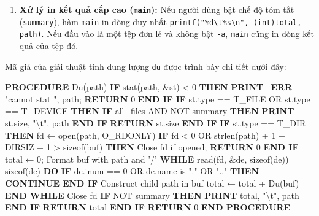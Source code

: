 \documentclass[12pt,a4paper]{article}
\newenvironment{algorithmblock}[1]{%
  \begin{tcolorbox}[
    enhanced,
    breakable,
    colback=white,
    colframe=primary!55,
    colbacktitle=primary,
    coltitle=white,
    boxrule=0.7pt,
    arc=2pt,
    left=10pt,right=10pt,top=7pt,bottom=8pt,
    title={#1},
    fonttitle=\small
  ]
}{%
  \end{tcolorbox}
}
\begin{document}
\begin{enumerate}
\begin{itemize}
\begin{itemize}
    \end{itemize}
    \item Đóng thư mục \texttt{close(fd)}.
    \item \textbf{In kết quả thư mục:} Nếu không bật cờ \texttt{summary}, in dung lượng tổng của thư mục hiện tại: \texttt{printf("\%d\textbackslash t\%s\textbackslash n", (int)total, path)}.
    \item Trả về giá trị \texttt{total}.
  \end{itemize}
  \item \textbf{Xử lý in kết quả cấp cao (\texttt{main}):}
  Nếu người dùng bật chế độ tóm tắt (\texttt{summary}), hàm \texttt{main} in dòng duy nhất \texttt{printf("\%d\textbackslash t\%s\textbackslash n", (int)total, path)}. Nếu đầu vào là một tệp đơn lẻ và không bật \texttt{-a}, \texttt{main} cũng in dòng kết quả của tệp đó.
\end{enumerate}

Mã giả của giải thuật tính dung lượng \texttt{du} được trình bày chi tiết dưới đây:

\begin{algorithmblock}{\texttt{du}}
\begin{algorithmcode}
\textbf{PROCEDURE} Du(path)
    \textbf{IF} stat(path, &st) < 0 \textbf{THEN}
        \textbf{PRINT\_ERR} "cannot stat ", path; \textbf{RETURN} 0
    \textbf{END IF}
    \textbf{IF} st.type == T_FILE OR st.type == T_DEVICE \textbf{THEN}
        \textbf{IF} all_files AND NOT summary \textbf{THEN}
            \textbf{PRINT} st.size, "\textbackslash t", path
        \textbf{END IF}
        \textbf{RETURN} st.size
    \textbf{END IF}
    \textbf{IF} st.type == T_DIR \textbf{THEN}
        fd ← open(path, O_RDONLY)
        \textbf{IF} fd < 0 OR strlen(path) + 1 + DIRSIZ + 1 > sizeof(buf) \textbf{THEN}
            Close fd if opened; \textbf{RETURN} 0
        \textbf{END IF}
        total ← 0; Format buf with path and '/'
        \textbf{WHILE} read(fd, &de, sizeof(de)) == sizeof(de) \textbf{DO}
            \textbf{IF} de.inum == 0 OR de.name is "." OR ".." \textbf{THEN}
                \textbf{CONTINUE}
            \textbf{END IF}
            Construct child path in buf
            total ← total + Du(buf)
        \textbf{END WHILE}
        Close fd
        \textbf{IF} NOT summary \textbf{THEN}
            \textbf{PRINT} total, "\textbackslash t", path
        \textbf{END IF}
        \textbf{RETURN} total
    \textbf{END IF}
    \textbf{RETURN} 0
\textbf{END PROCEDURE}
\end{algorithmcode}
\end{algorithmblock}
\end{document}
